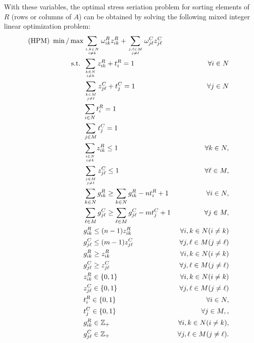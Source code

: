 \documentclass[a4paper,11pt, reqno]{amsart}
\def\Z{\mathbb{Z}}
\begin{document}
With these variables, the optimal stress seriation problem for sorting elements of 
$R$ (rows or columns of $A$) can be obtained by solving the following mixed integer linear optimization problem:
\begin{align}
 \hbox{(HPM)}\ \min / \max & \sum_{i,k\in N\atop i\neq k} \omega^R_{ik} z^R_{ik} + \sum_{j, \ell\in M\atop j\neq \ell} \omega^C_{j\ell} z^C_{j\ell}\label{tsp:obj}\\
    \mbox{s.t. } & \sum_{k\in N\atop i\neq k} z^R_{ik} + t^R_i = 1 & \forall i\in N \label{tsp:1a}\\
    & \sum_{k\in M\atop j\neq \ell} z^C_{j\ell} + t^C_j = 1 & \forall j\in N \label{tsp:1b}\\
    & \sum_{i \in N} t^R_i = 1 \label{tsp:2a} \\
    & \sum_{j \in M} t^C_j = 1 \label{tsp:2b} \\
    & \sum_{i\in N\atop i\neq k} z^R_{ik} \le 1 & \forall k\in N, \label{tsp:3a}\\
    & \sum_{j\in M\atop j\neq \ell} z^C_{j\ell} \le 1 & \forall \ell\in M, \label{tsp:3b}\\
    & \sum_{k\in N} g^R_{ik} \ge \sum_{k\in N} g^R_{ik}-n t^R_i+1 & \forall i\in N,\label{tsp:4a}\\
    & \sum_{\ell\in M} g^C_{j\ell} \ge \sum_{\ell\in M} g^C_{j\ell}- m t^C_j+1 & \forall j\in M,\label{tsp:4b}\\
    & g^R_{ik}\le (n-1)z^R_{ik} & \forall i, k \in N (i\neq k) \label{tsp:5a}\\
    & g^C_{j\ell}\le (m-1)z^C_{j\ell} & \forall j, \ell \in M (j\neq \ell) \label{tsp:5b}\\
    & g^R_{ik} \ge z^R_{ik} & \forall i, k\in N (i\neq k) \label{tsp:6a} \\
        & g^C_{j\ell} \ge z^C_{j\ell} & \forall j, \ell \in M (j\neq \ell) \label{tsp:6b} \\
    & z^R_{ik} \in \{0,1\} & \forall i, k \in N (i \neq k) \label{tsp:7a} \\
    & z^C_{j\ell} \in \{0,1\} & \forall j, \ell \in M (j \neq \ell) \label{tsp:7b} \\
    & t^R_i \in \{0,1\} & \forall i\in N,
    \label{tsp:8a}\\
     & t^C_j \in \{0,1\} & \forall j\in M,
    \label{tsp:8b},\\
    & g^R_{ik} \in \Z_+ & \forall i, k\in N (i\neq k),\label{tsp:9a}\\
    & g^C_{j\ell} \in \Z_+ & \forall j, \ell\in M (j\neq \ell).\label{tsp:9b}
\end{align}
\end{document}
